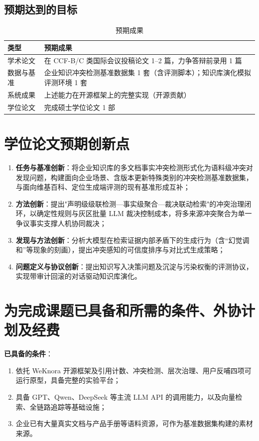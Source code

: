 \subsection{预期达到的目标}

\begin{table}[htbp]
  \centering
  \caption{预期成果}
  \label{tab:achieve}
  \begin{tabular}{p{}p{}}
    \toprule
    类型 & 预期成果 \\
    \midrule
    学术论文 & 在 CCF-B/C 类国际会议投稿论文 1--2 篇，力争答辩前录用 1 篇 \\
    数据与基准 & 企业知识冲突检测基准数据集 1 套（含评测脚本）；知识库演化模拟评测环境 1 套 \\
    系统成果 & 上述能力在开源框架上的完整实现（开源贡献） \\
    学位论文 & 完成硕士学位论文 1 部 \\
    \bottomrule
  \end{tabular}
\end{table}

\section{学位论文预期创新点}

\begin{enumerate}
  \item \textbf{任务与基准创新}：将企业知识库的多文档事实冲突检测形式化为语料级冲突对发现问题，构建面向企业场景、含版本更新特殊类别的冲突检测基准数据集，与面向维基百科、定位生成端评测的现有基准形成互补；
  \item \textbf{方法创新}：提出"声明级级联检测—事实级聚合—裁决联动检索"的冲突治理闭环，以确定性规则与灰区批量 LLM 裁决控制成本，将多来源冲突聚合为单一争议事实支撑人机协同裁决；
  \item \textbf{发现与方法创新}：分析大模型在检索证据内部矛盾下的生成行为（含“幻觉调和”等现象的刻画），提出冲突感知的可信度排序与对比式生成策略；
  \item \textbf{问题定义与协议创新}：提出知识写入决策问题及沉淀与污染权衡的评测协议，实现带审计回滚的对话驱动知识库演化。
\end{enumerate}

\section{为完成课题已具备和所需的条件、外协计划及经费}

\textbf{已具备的条件}：
\begin{enumerate}
  \item 依托 WeKnora 开源框架及引用计数、冲突检测、层次治理、用户反哺四项可运行原型，具备完整的实验平台；
  \item 具备 GPT、Qwen、DeepSeek 等主流 LLM API 的调用能力，以及向量检索、全链路追踪等基础设施；
  \item 企业已有大量真实文档与产品手册等语料资源，可作为基准数据集构建的素材来源。
\end{enumerate}

